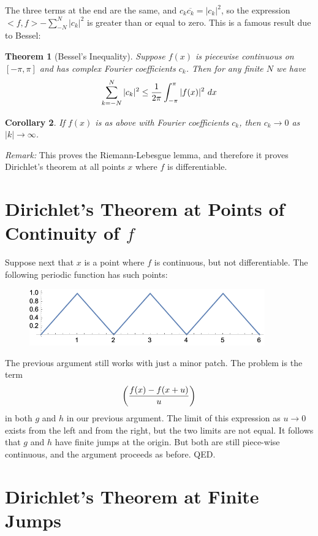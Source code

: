 \documentclass[11pt, oneside]{article}   	%
\newtheorem{theorem}{Theorem}
\newtheorem{corollary}[theorem]{Corollary}
\begin{document}
The three terms at the end are the same, and $c_k \overline{c_k} = \left| c_k \right|^2$, so the expression
$<f, f> - \sum_{-N}^N  \left| c_k \right|^2$ is greater than or equal to zero. This is a famous result due to Bessel:

\begin{theorem}[Bessel's Inequality]
Suppose $f(x)$ is piecewise continuous on $[- \pi, \pi]$ and has complex Fourier coefficients $c_k$. Then for any finite $N$ we have
\[\sum_{k = - N}^N |c_k|^2 \le {1 \over {2 \pi}} \int_{- \pi}^\pi |f(x)|^2\ dx\]
\end{theorem}

\begin{corollary}
If $f(x)$ is as above with Fourier coefficients $c_k$, then $c_k \rightarrow 0$ as $|k| \rightarrow \infty$.
\end{corollary}

{\em Remark:} This proves the Riemann-Lebesgue lemma, and therefore it proves Dirichlet's theorem at all points $x$ where $f$ is differentiable.

\section{Dirichlet's Theorem at Points of Continuity of $f$}

Suppose next that $x$ is a point where $f$ is continuous, but not differentiable. The following periodic function has such points:

\begin{figure}[htbp] %
   \centering
   \includegraphics[width=4in]{Graphics/longwedge}
\end{figure}

The previous argument still works with just a minor patch. The problem is the term 
\[\left( {{f(x) - f(x + u)} \over {u}}\right)\]
in both $g$ and $h$ in our previous argument. The limit of this expression as $u \rightarrow 0$ exists from the left and from the right, but the two limits are not equal. It follows that $g$ and $h$ have finite jumps at the origin. But both are still piece-wise continuous, and the argument proceeds as before. QED.

\section{Dirichlet's Theorem at Finite Jumps}
\end{document}
